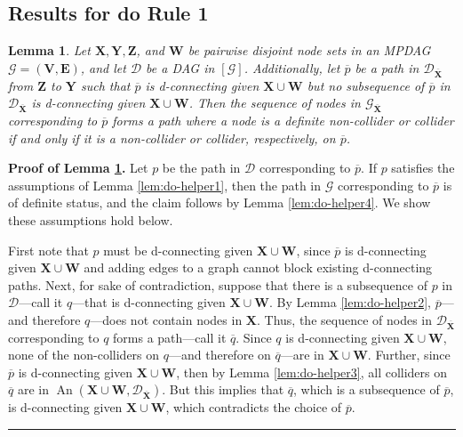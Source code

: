 \documentclass[11pt]{article}
\DeclareMathOperator{\An}{An}
\newcommand{\BlackBox}{\rule{1.5ex}{1.5ex}}  %
\newtheorem{lemma}[theorem]{Lemma}
\newcommand{\mb}[1]{\mathbf{#1}}
\newcommand{\g}[1][G]{\mathcal{#1}}
\newenvironment{proofof}[1][]{\noindent \textbf{Proof of #1.}}{\hfill\BlackBox}
\begin{document}

\subsection{Results for do Rule 1}


\begin{lemma}
\label{lem:zhang-modify-1a}
    Let $\mb{X,Y,Z}$, and $\mb{W}$ be pairwise disjoint node sets in an MPDAG $\g= (\mb{V,E})$, and let $\g[D]$ be a DAG in $[\g]$. Additionally, let $\overline{p}$ be a path in $\g[D]_{\overline{\mb{X}}}$ from $\mb{Z}$ to $\mb{Y}$ such that $\overline{p}$ is d-connecting given $\mb{X} \cup \mb{W}$ but no subsequence of $\overline{p}$ in $\g[D]_{\overline{\mb{X}}}$ is d-connecting given $\mb{X} \cup \mb{W}$. Then the sequence of nodes in $\g_{\overline{\mb{X}}}$ corresponding to $\overline{p}$ forms a path where a node is a definite non-collider or collider if and only if it is a non-collider or collider, respectively, on $\overline{p}$.
\end{lemma}

\begin{proofof}[Lemma \ref{lem:zhang-modify-1a}]
    Let $p$ be the path in $\g[D]$ corresponding to $\overline{p}$. If $p$ satisfies the assumptions of Lemma \ref{lem:do-helper1}, then the path in $\g$ corresponding to $\overline{p}$ is of definite status, and the claim follows by Lemma \ref{lem:do-helper4}. We show these assumptions hold below.

    First note that $p$ must be d-connecting given $\mb{X} \cup \mb{W}$, since $\overline{p}$ is d-connecting given $\mb{X} \cup \mb{W}$ and adding edges to a graph cannot block existing d-connecting paths. Next, for sake of contradiction, suppose that there is a subsequence of $p$ in $\g[D]$---call it $q$---that is d-connecting given $\mb{X} \cup \mb{W}$. By Lemma \ref{lem:do-helper2}, $\overline{p}$---and therefore $q$---does not contain nodes in $\mb{X}$. Thus, the sequence of nodes in $\g[D]_{\overline{\mb{X}}}$ corresponding to $q$ forms a path---call it $\overline{q}$. Since $q$ is d-connecting given $\mb{X} \cup \mb{W}$, none of the non-colliders on $q$---and therefore on $\overline{q}$---are in $\mb{X} \cup \mb{W}$. Further, since $\overline{p}$ is d-connecting given $\mb{X} \cup \mb{W}$, then by Lemma \ref{lem:do-helper3}, all colliders on $\overline{q}$ are in $\An(\mb{X} \cup \mb{W}, \g[D]_{\overline{\mb{X}}})$. But this implies that $\overline{q}$, which is a subsequence of $\overline{p}$, is d-connecting given $\mb{X} \cup \mb{W}$, which contradicts the choice of $\overline{p}$.
\end{proofof}
\end{document}
